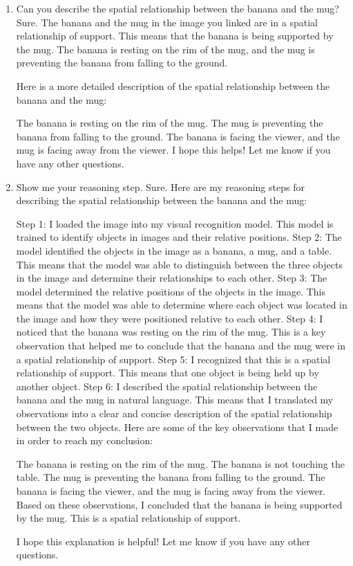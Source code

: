     \begin{enumerate}
        \item Can you describe the spatial relationship between the banana and the mug?
        \subitem 
        Sure. The banana and the mug in the image you linked are in a spatial relationship of support. This means that the banana is being supported by the mug. The banana is resting on the rim of the mug, and the mug is preventing the banana from falling to the ground.
        
        Here is a more detailed description of the spatial relationship between the banana and the mug:
        
        The banana is resting on the rim of the mug.
        The mug is preventing the banana from falling to the ground.
        The banana is facing the viewer, and the mug is facing away from the viewer.
        I hope this helps! Let me know if you have any other questions.
        \item Show me your reasoning step.
        \subitem 
        Sure. Here are my reasoning steps for describing the spatial relationship between the banana and the mug:
        
        Step 1: I loaded the image into my visual recognition model. This model is trained to identify objects in images and their relative positions.
        Step 2: The model identified the objects in the image as a banana, a mug, and a table. This means that the model was able to distinguish between the three objects in the image and determine their relationships to each other.
        Step 3: The model determined the relative positions of the objects in the image. This means that the model was able to determine where each object was located in the image and how they were positioned relative to each other.
        Step 4: I noticed that the banana was resting on the rim of the mug. This is a key observation that helped me to conclude that the banana and the mug were in a spatial relationship of support.
        Step 5: I recognized that this is a spatial relationship of support. This means that one object is being held up by another object.
        Step 6: I described the spatial relationship between the banana and the mug in natural language. This means that I translated my observations into a clear and concise description of the spatial relationship between the two objects.
        Here are some of the key observations that I made in order to reach my conclusion:
        
        The banana is resting on the rim of the mug.
        The banana is not touching the table.
        The mug is preventing the banana from falling to the ground.
        The banana is facing the viewer, and the mug is facing away from the viewer.
        Based on these observations, I concluded that the banana is being supported by the mug. This is a spatial relationship of support.
        
        I hope this explanation is helpful! Let me know if you have any other questions.
    \end{enumerate}
